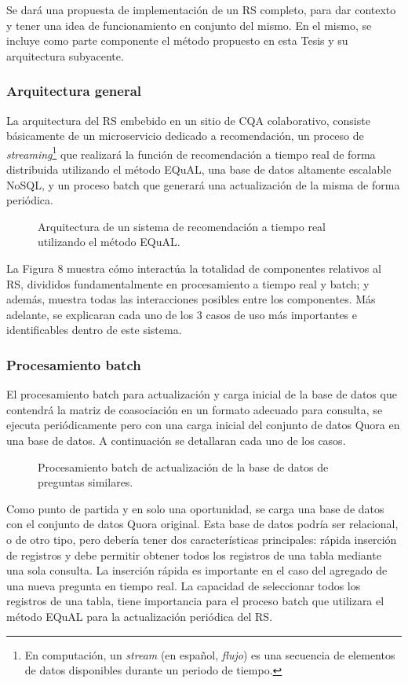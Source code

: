 \bigskip Se dará una propuesta de implementación de un RS completo, para dar contexto y tener una idea de funcionamiento en conjunto del mismo. En el mismo, se incluye como parte componente el método propuesto en esta Tesis y su arquitectura subyacente.

\subsubsection{Arquitectura general}
La arquitectura del RS embebido en un sitio de CQA colaborativo, consiste básicamente de un microservicio dedicado a recomendación, un proceso de \textit{streaming}\footnote{En computación, un \textit{stream} (en español, \textit{flujo}) es una secuencia de elementos de datos disponibles durante un periodo de tiempo.} que realizará la función de recomendación a tiempo real de forma distribuida utilizando el método EQuAL, una base de datos altamente escalable NoSQL, y un proceso batch que generará una actualización de la misma de forma periódica.
\begin{figure}
	\def\svgwidth{\linewidth}
	
	\caption{Arquitectura de un sistema de recomendación a tiempo real utilizando el método EQuAL.}
\end{figure}

La Figura 8 muestra cómo interactúa la totalidad de componentes relativos al RS, divididos fundamentalmente en procesamiento a tiempo real y batch; y además, muestra todas las interacciones posibles entre los componentes. Más adelante, se explicaran cada uno de los 3 casos de uso más importantes e identificables dentro de este sistema.

\subsubsection{Procesamiento batch}
El procesamiento batch para actualización y carga inicial de la base de datos que contendrá la matriz de coasociación en un formato adecuado para consulta, se ejecuta periódicamente pero con una carga inicial del conjunto de datos Quora en una base de datos. A continuación se detallaran cada uno de los casos.
\begin{figure}
	\def\svgwidth{\linewidth}
	
	\caption{Procesamiento batch de actualización de la base de datos de preguntas similares.}
\end{figure}

Como punto de partida y en solo una oportunidad, se carga una base de datos con el conjunto de datos Quora original. Esta base de datos podría ser relacional, o de otro tipo, pero debería tener dos características principales: rápida inserción de registros y debe permitir obtener todos los registros de una tabla mediante una sola consulta. La inserción rápida es importante en el caso del agregado de una nueva pregunta en tiempo real. La capacidad de seleccionar todos los registros de una tabla, tiene importancia para el proceso batch que utilizara el método EQuAL para la actualización periódica del RS.

